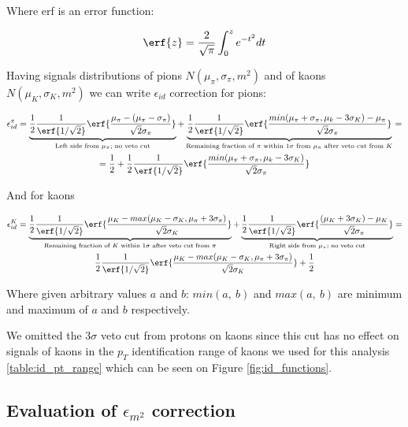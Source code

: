 Where erf is an error function:

\begin{equation}
	\erf{z} = \frac{2}{\sqrt{\pi}} \int_0^z e^{-t^2} dt
\end{equation}

Having signals distributions of pions $N(\mu_\pi, \sigma_\pi, m^2)$ and of kaons $N(\mu_K, \sigma_K, m^2)$ we can write $\epsilon_{id}$ correction for pions:

\begin{multline}
	\epsilon_{id}^{\pi} = 
	\underbrace{\frac{1}{2}\frac{1}{\erf{1/\sqrt{2}}} 
	\erf{\frac{\mu_{\pi} - (\mu_{\pi} - \sigma_{\pi})}
	{\sqrt{2} \sigma_{\pi}}}}_{\text{Left side from } \mu_{\pi}\text{; no veto cut}} + 
	\underbrace{\frac{1}{2}\frac{1}{\erf{1/\sqrt{2}}} 
	\erf{\frac{min(\mu_{\pi} + \sigma_{\pi}, \mu_{k} - 3\sigma_{K}) - \mu_{\pi}}
	{\sqrt{2} \sigma_{\pi}}}}_{
	\text{Remaining fraction of $\pi$ within $1\sigma$ from $\mu_\pi$ after veto cut from $K$}} = \\
	= \frac{1}{2} + \frac{1}{2}\frac{1}{\erf{1/\sqrt{2}}} 
	\erf{\frac{min(\mu_{\pi} + \sigma_{\pi}, \mu_{k} - 3\sigma_{K})}
	{\sqrt{2} \sigma_{\pi}}}
\end{multline}

And for kaons

\begin{multline}
	\epsilon_{id}^{K} = 
	\underbrace{\frac{1}{2}\frac{1}{\erf{1/\sqrt{2}}} 
	\erf{\frac{\mu_K - max(\mu_K - \sigma_K, \mu_\pi + 3\sigma_\pi)}
	{\sqrt{2} \sigma_K}}}_{\text{Remaining fraction of $K$ within $1\sigma$ after veto cut from $\pi$}} + 
	\underbrace{\frac{1}{2}\frac{1}{\erf{1/\sqrt{2}}} 
	\erf{\frac{(\mu_{K} + 3\sigma_{K}) - \mu_K}
	{\sqrt{2} \sigma_{\pi}}}}_{\text{Right side from $\mu_{\pi}$; no veto cut}} = \\
	\frac{1}{2}\frac{1}{\erf{1/\sqrt{2}}} 
	\erf{\frac{\mu_K - max(\mu_K - \sigma_K, \mu_\pi + 3\sigma_\pi)}{\sqrt{2} \sigma_K}} + 
	\frac{1}{2}
\end{multline}

Where given arbitrary values $a$ and $b$: $min(a, \ b)$ and $max(a, \ b)$ are minimum and maximum of $a$ and $b$ respectively.

We omitted the $3\sigma$ veto cut from protons on kaons since this cut has no effect on signals of kaons in the $p_T$ identification range of kaons we used for this analysis \ref{table:id_pt_range} which can be seen on Figure \ref{fig:id_functions}.

\subsection{Evaluation of $\epsilon_{m^2}$ correction}

